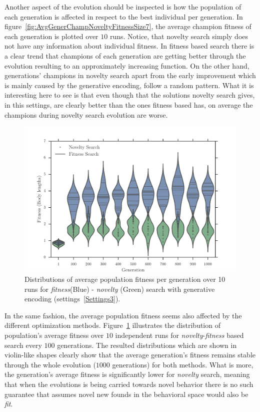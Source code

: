 Another aspect of the evolution should be inspected is how the population of each generation is affected in respect to the best individual per generation. In figure~\ref{fig:AvgGenerChampNoveltyFitnessSize7}, the average champion fitness of each generation is plotted over $10$ runs. Notice, that novelty search simply does not have any information about individual fitness. In fitness based search there is a clear trend that champions of each generation are getting better through the evolution resulting to an approximately increasing function. On the other hand, generations' champions in novelty search apart from the early improvement which is mainly caused by the generative encoding, follow a random pattern. What it is interesting here to see is that even though that the solutions novelty search gives, in this settings, are clearly better than the ones fitness based has, on average the champions during novelty search evolution are worse.


\begin{figure}[ht!]
\centering
\includegraphics[width=1.0\textwidth]{../Figures/Results/ViolinPlotsAvgGenFitSize7.pdf}
\caption{Distributions of average population fitness per generation over 10 runs for \emph{fitness}(Blue) - \emph{novelty} (Green) search with generative encoding (settings~\ref{Settings3}).}
\label{fig:ViolinPlotsAvgGenFitSize7}
\end{figure}

In the same fashion, the average population fitness seems also affected by the different optimization methods. Figure~\ref{fig:ViolinPlotsAvgGenFitSize7} illustrates the distribution of population's average fitness over $10$ independent runs for \emph{novelty}-\emph{fitness} based search every $100$ generations. The resulted distributions which are shown in violin-like shapes clearly show that the average generation's fitness remains stable through the whole evolution ($1000$ generations) for both methods. What is more, the generation's average fitness is significantly lower for \emph{novelty} search, meaning that when the evolutions is being carried towards novel behavior there is no such guarantee that assumes novel new founds in the behavioral space would also be \emph{fit}.




